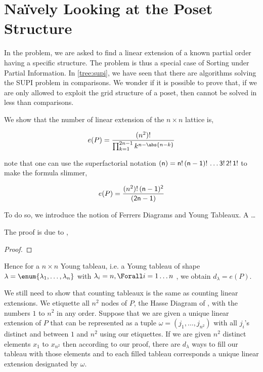 \section{Naïvely Looking at the Poset Structure}
\label{tree:xy:grid}

In the \XY problem, we are asked to find a linear extension of a known partial
order having a specific structure. The \XY problem is thus a special case of
Sorting under Partial Information. In \ref{tree:supi}, we have seen that there
are algorithms solving the SUPI problem in  comparisons. We
wonder if it is possible to prove that, if we are only allowed to exploit the
grid structure of a \XY poset, then \XY cannot be solved in less than  comparisons.

We show that the number of linear extension of the \( n \times n \) lattice is,

\begin{displaymath}
e(P) = \frac{(n^2)!}{\prod_{k=1}^{2n-1} k^{n - \abs{n-k}}}
\end{displaymath}

note that one can use the superfactorial notation
\( \sf(n) = n!\,(n-1)!\,\ldots 3!\,2!\,1! \)
to make the formula slimmer,

\begin{displaymath}
e(P) = \frac{(n^2)! \, \sf(n-1)^2}{\sf(2n-1)}
\end{displaymath}

To do so, we introduce the notion of Ferrers Diagrams and Young Tableaux. A
\dots

The proof is due to \citet*{greene:1979},

\begin{proof}

\end{proof}

Hence for a \( n \times n \) Young tableau, i.e. a Young tableau of shape
\( \lambda = \enum{ \lambda_1 , \ldots , \lambda_n } \)
with
\( \lambda_i = n, \Forall i = 1 \ldots n \)
, we obtain
\( d_{\lambda} = e(P) \).

We still need to show that counting tableaux is the same as counting linear
extensions. We etiquette all \( n^2 \) nodes of \(P\), the Hasse Diagram of
\XY, with the numbers \(1\) to \( n^2 \) in any order. Suppose that we are
given a unique linear extension of \(P\) that can be represented as a tuple
\( \omega = ( j_1 , \ldots , j_{n^2}) \)
with all \( j_i \)'s distinct and between \(1\) and \( n^2 \) using our
etiquettes. If we are given \( n^2 \) distinct elements \( x_1 \) to
\( x_{n^2} \) then according to our proof, there are \( d_{\lambda} \) ways to
fill our tableau with those elements and to each filled tableau corresponds a
unique linear extension designated by \(\omega\).

